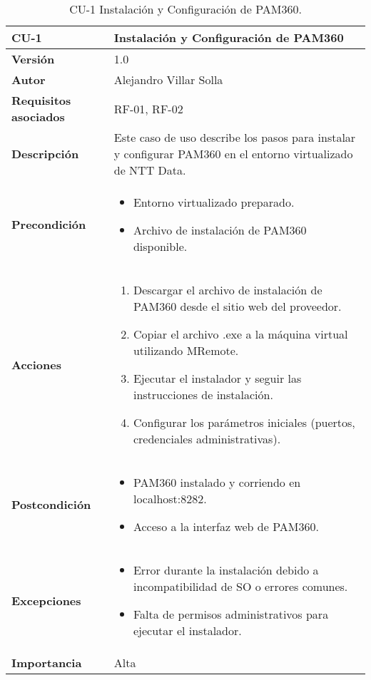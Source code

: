 \begin{table}[p]
	\centering
	\begin{tabularx}{\linewidth}{ p{} p{} }
		\toprule
		\textbf{CU-1}    & \textbf{Instalación y Configuración de PAM360}\\
		\toprule
		\textbf{Versión}              & 1.0    \\
		\textbf{Autor}                & Alejandro Villar Solla \\
		\textbf{Requisitos asociados} & RF-01, RF-02 \\
		\textbf{Descripción}          & Este caso de uso describe los pasos para instalar y configurar PAM360 en el entorno virtualizado de NTT Data. \\
		\textbf{Precondición}         & 
		\begin{itemize}
			\item Entorno virtualizado preparado.
			\item Archivo de instalación de PAM360 disponible.
		\end{itemize}\\
		\textbf{Acciones}             &
		\begin{enumerate}
			\item Descargar el archivo de instalación de PAM360 desde el sitio web del proveedor.
			\item Copiar el archivo .exe a la máquina virtual utilizando MRemote.
			\item Ejecutar el instalador y seguir las instrucciones de instalación.
			\item Configurar los parámetros iniciales (puertos, credenciales administrativas).
		\end{enumerate}\\
		\textbf{Postcondición}        & 
		\begin{itemize}
			\item PAM360 instalado y corriendo en localhost:8282.
			\item Acceso a la interfaz web de PAM360.
		\end{itemize}\\
		\textbf{Excepciones}          & 
		\begin{itemize}
			\item Error durante la instalación debido a incompatibilidad de SO o errores comunes.
			\item Falta de permisos administrativos para ejecutar el instalador.
		\end{itemize}\\
		\textbf{Importancia}          & Alta \\
		\bottomrule
	\end{tabularx}
	\caption{CU-1 Instalación y Configuración de PAM360.}
\end{table}

